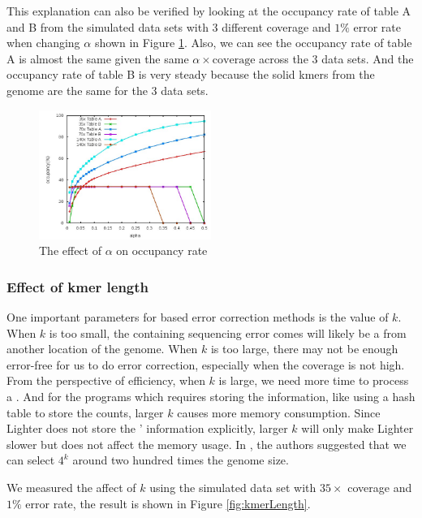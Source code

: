 \documentclass[10pt]{article}
\begin{document}
This explanation can also be verified by looking at the occupancy rate of table A and B from the simulated data sets with 3 different coverage and $1\%$ error rate when changing $\alpha$ shown in Figure \ref{fig:bloom_occupancy_alpha}. Also, we can see the occupancy rate of table A is almost the same given the same $\alpha\times\mbox{coverage}$ across the 3 data sets. And the occupancy rate of table B is very steady because the solid kmers from the genome are the same for the 3 data sets. 

\begin{figure}[h!]
\begin{center}
\includegraphics[width=0.5\textwidth]{bloom_occupancy_alpha.jpg}
\caption{The effect of $\alpha$ on occupancy rate\label{fig:bloom_occupancy_alpha}}
\end{center}
\end{figure}

\subsubsection*{Effect of kmer length}
One important parameters for \kmer based error correction methods is the value of $k$. When $k$ is too small, the \kmer containing sequencing error comes will likely be a \kmer from another location of the genome. When $k$ is too large, there may not be enough error-free \kmers for us to do error correction, especially when the coverage is not high. From the perspective of efficiency, when $k$ is large, we need more time to process a \kmer. And for the programs which requires storing the \kmer information, like using a hash table to store the counts, larger $k$ causes more memory consumption. Since Lighter does not store the \kmers' information explicitly, larger $k$ will only make Lighter slower but does not affect the memory usage.  In \cite{kelley2010quake}, the authors suggested that we can select $4^k$ around two hundred times the genome size. 

We measured the affect of $k$ using the simulated data set with $35 \times$ coverage and $1\%$ error rate, the result is shown in Figure \ref{fig:kmerLength}. 
\end{document}
